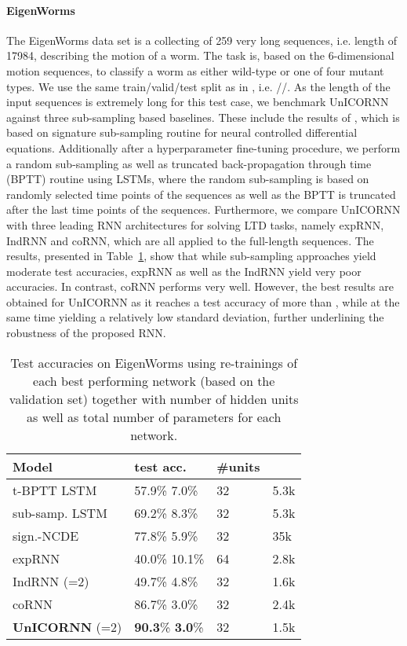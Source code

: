 \documentclass{article}
\newcommand{\Tref}[1]{Table~\ref{#1}}
\begin{document}
\paragraph{EigenWorms}
The EigenWorms data set \cite{eigenworms} is a collecting of 259 very long sequences, i.e. length of 17984, describing the motion of a worm. The task is, based on the 6-dimensional motion sequences, to classify a worm as either wild-type or one of four mutant types. We use the same train/valid/test split as in \cite{log_ode}, i.e. //. As the length of the input sequences is extremely long for this test case, we benchmark UnICORNN against three sub-sampling based baselines. These include the results of \cite{log_ode}, which is based on signature sub-sampling routine for neural controlled differential equations. Additionally after a hyperparameter fine-tuning procedure, we perform a random sub-sampling as well as truncated back-propagation through time (BPTT) routine using LSTMs, where the random sub-sampling is based on  randomly selected time points of the sequences as well as the BPTT is truncated after the last  time points of the sequences. Furthermore, we compare UnICORNN with three leading RNN architectures for solving LTD tasks, namely expRNN, IndRNN and coRNN, which are all applied to the full-length sequences. The results, presented in \Tref{tab:worms}, show that while sub-sampling approaches yield moderate test accuracies, expRNN as well as the IndRNN yield very poor accuracies. In contrast, coRNN performs very well. However, the best results are obtained for UnICORNN as it reaches a test accuracy of more than , while at the same time yielding a relatively low standard deviation, further underlining the robustness of the proposed RNN.
\begin{table}[ht]
\caption{Test accuracies on EigenWorms using  re-trainings of each best performing network (based on the validation set) together with number of hidden units as well as total number of parameters  for each network.}
\label{tab:worms}
\vskip 0.15in
\begin{center}
\begin{small}
\begin{sc}
\begin{tabular}{llll}
\toprule
Model     & test acc. & \#units &  \\
\midrule
t-BPTT LSTM & 57.9\%  7.0\% &32 & 5.3k\\
sub-samp. LSTM &  69.2\%  8.3\% &32 & 5.3k\\
sign.-NCDE & 77.8\%  5.9\% & 32 & 35k\\
\midrule
expRNN & 40.0\%  10.1\% & 64 & 2.8k \\
IndRNN (=2) & 49.7\%  4.8\% & 32 & 1.6k \\
coRNN & 86.7\%  3.0\%&32 & 2.4k \\
\textbf{UnICORNN} (=2) & \textbf{90.3}\%  \textbf{3.0}\% & 32 & 1.5k\\
\bottomrule
\end{tabular}
\end{sc}
\end{small}
\end{center}
\vskip -0.1in
\end{table}
\end{document}
